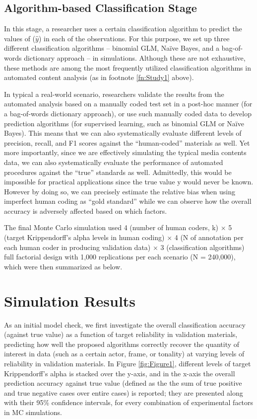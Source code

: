 \documentclass[man, floatsintext, 12pt, a4paper, noextraspace]{apa6}
\begin{document}
    \subsection{Algorithm-based Classification Stage}
    
    In this stage, a researcher uses a certain classification algorithm to predict the values of ($\hat{y}$) in each of the observations. For this purpose, we set up three different classification algorithms – binomial GLM, Naïve Bayes, and a bag-of-words dictionary approach -- in simulations. Although these are not exhaustive, these methods are among the most frequently utilized classification algorithms in automated content analysis (as in footnote \ref{fn:Study1} above). 
    
    In typical a real-world scenario, researchers validate the results from the automated analysis based on a manually coded test set in a post-hoc manner (for a bag-of-words dictionary approach), or use such manually coded data to develop prediction algorithms (for supervised learning, such as binomial GLM or Naïve Bayes). This means that we can also systematically evaluate different levels of precision, recall, and F1 scores against the \enquote{human-coded} materials as well. Yet more importantly, since we are effectively simulating the typical media contents data, we can also systematically evaluate the performance of automated procedures against the \enquote{true} standards as well. Admittedly, this would be impossible for practical applications since the true value y would never be known. However by doing so, we can precisely estimate the relative bias when using imperfect human coding as \enquote{gold standard} while we can observe how the overall accuracy is adversely affected based on which factors. 
    
    The final Monte Carlo simulation used 4 (number of human coders, k) $\times$ 5 (target Krippendorff's alpha levels in human coding) $\times$ 4 (N of annotation per each human coder in producing validation data) $\times$ 3 (classification algorithms) full factorial design with 1,000 replications per each scenario (N = 240,000), which were then summarized as below.
    
\section{Simulation Results}

    As an initial model check, we first investigate the overall classification accuracy (against true value) as a function of target reliability in validation materials, predicting how well the proposed algorithms correctly recover the quantity of interest in data (such as a certain actor, frame, or tonality) at varying levels of reliability in validation materials. In Figure \ref{fig:Figure1}, different levels of target Krippendorff's alpha is stacked over the y-axis, and in the x-axis the overall prediction accuracy against true value (defined as the the sum of true positive and true negative cases over entire cases) is reported; they are presented along with their 95\% confidence intervals, for every combination of experimental factors in MC simulations.
\end{document}
